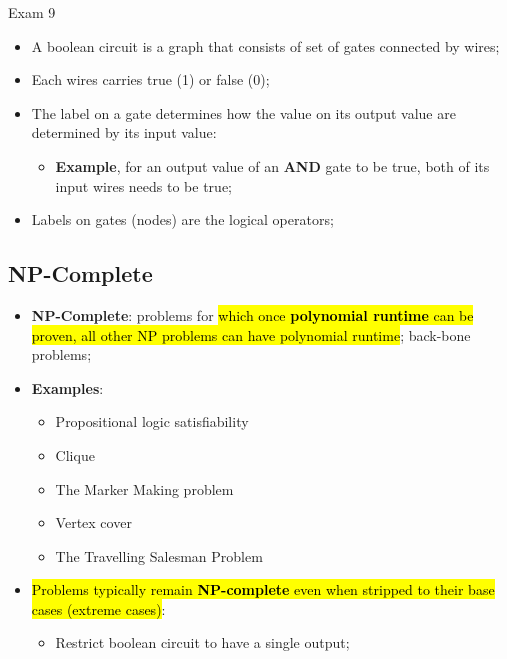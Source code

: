 \documentclass{note}
\begin{document}
\begin{note}{Exam 9}
        \begin{itemize}
            \item A boolean circuit is a graph that consists of set of gates connected by wires;
            \item Each wires carries true (1) or false (0);
            \item The label on a gate determines how the value on its output value are determined by its input value:
            \begin{itemize}
                \item \textbf{Example}, for an output value of an \textbf{AND} gate to be true, both of its input wires needs to be true;
            \end{itemize}
            \item Labels on gates (nodes) are the logical operators;
        \end{itemize}

    \subsection{NP-Complete}

    \begin{itemize}
        \item \textbf{NP-Complete}: problems for \hl{which once \textbf{polynomial runtime} can be proven, all other NP problems can have
        polynomial runtime}; back-bone problems;
        
        \item \textbf{Examples}:
        \begin{itemize}
            \item Propositional logic satisfiability
            \item Clique
            \item The Marker Making problem
            \item Vertex cover
            \item The Travelling Salesman Problem
        \end{itemize}

        \item \hl{Problems typically remain \textbf{NP-complete} even when stripped to their base cases (extreme cases)}:
        \begin{itemize}
            \item Restrict boolean circuit to have a single output;
        \end{itemize}
    \end{itemize}


\end{note}
\end{document}
